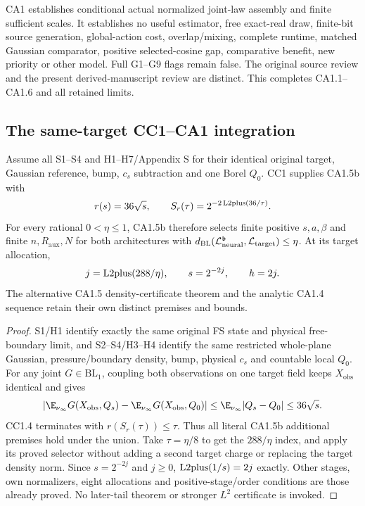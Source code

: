 CA1 establishes conditional actual normalized joint-law assembly and finite
sufficient scales. It establishes no useful estimator, free exact-real
draw, finite-bit source generation, global-action cost, overlap/mixing,
complete runtime, matched Gaussian comparator, positive selected-cosine
gap, comparative benefit, new priority or other model. Full G1--G9 flags
remain false. The original source review and the present derived-manuscript
review are distinct. This completes CA1.1--CA1.6 and all retained limits.

\subsection{The same-target CC1--CA1 integration}
\begin{corollary}\label{cm:union}
Assume all S1--S4 and H1--H7/Appendix S for their identical original target,
Gaussian reference, bump, $c_s$ subtraction and one Borel $Q_0$.
CC1 supplies CA1.5b with
\[
 r(s)=36\sqrt s,\qquad S_r(\tau)=2^{-2\operatorname{L2plus}(36/\tau)} .
\]
For every rational $0<\eta\le1$, CA1.5b therefore selects finite positive
$s,a,\beta$ and finite $n,R_{\mathrm{aux}},N$ for both architectures with
$d_{\mathrm{BL}}(\mathcal L_{\mathrm{neural}}^{\mathfrak b},
\mathcal L_{\mathrm{target}})\le\eta$. At its target allocation,
\[
 j=\operatorname{L2plus}(288/\eta),\qquad s=2^{-2j},\qquad h=2j.
\]
The alternative CA1.5 density-certificate theorem and the analytic CA1.4
sequence retain their own distinct premises and bounds.
\end{corollary}
\begin{proof}
S1/H1 identify exactly the same original FS state and physical free-boundary
limit, and S2--S4/H3--H4 identify the same restricted whole-plane Gaussian,
pressure/boundary density, bump, physical $c_s$ and countable local
$Q_0$. For any joint $G\in\mathrm{BL}_1$, coupling both observations on
one target field keeps $X_{\mathrm{obs}}$ identical and gives
\[
 |\E_{\nu_\infty}G(X_{\mathrm{obs}},Q_s)
       -\E_{\nu_\infty}G(X_{\mathrm{obs}},Q_0)|
 \le\E_{\nu_\infty}|Q_s-Q_0|\le36\sqrt s.
\]
CC1.4 terminates with $r(S_r(\tau))\le\tau$. Thus all literal CA1.5b
additional premises hold under the union. Take $\tau=\eta/8$ to get the
$288/\eta$ index, and apply its proved selector without adding a second
target charge or replacing the target density norm. Since $s=2^{-2j}$
and $j\ge0$, $\operatorname{L2plus}(1/s)=2j$ exactly. Other stages, own normalizers,
eight allocations and positive-stage/order conditions are those already
proved. No later-tail theorem or stronger $L^2$ certificate is invoked.
\end{proof}

